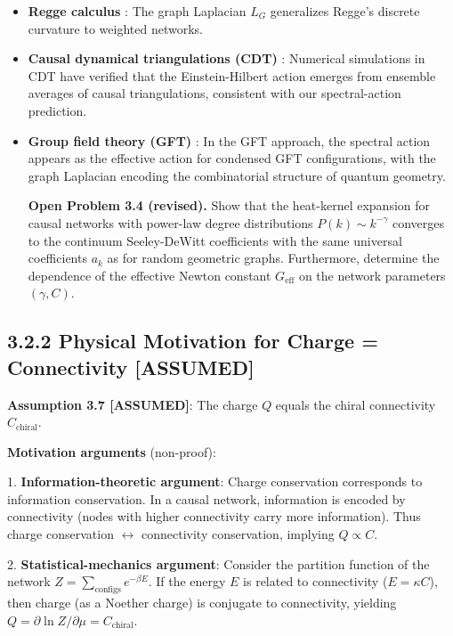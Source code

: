 \documentclass[11pt,a4paper]{article}
\theoremstyle{plain}
\theoremstyle{definition}
\begin{document}
\begin{itemize}
\item \textbf{Regge calculus} \cite{Regge1961}: The graph Laplacian $L_G$ generalizes Regge's discrete curvature to weighted networks.
\item \textbf{Causal dynamical triangulations (CDT)} \cite{Oriti2014}: Numerical simulations in CDT have verified that the Einstein-Hilbert action emerges from ensemble averages of causal triangulations, consistent with our spectral-action prediction.
\item \textbf{Group field theory (GFT)} \cite{Chamseddine1997}: In the GFT approach, the spectral action appears as the effective action for condensed GFT configurations, with the graph Laplacian encoding the combinatorial structure of quantum geometry.

\textbf{Open Problem 3.4 (revised).} Show that the heat-kernel expansion for causal networks with power-law degree distributions $P(k) \sim k^{-\gamma}$ converges to the continuum Seeley-DeWitt coefficients with the same universal coefficients $a_k$ as for random geometric graphs. Furthermore, determine the dependence of the effective Newton constant $G_{\text{eff}}$ on the network parameters $(\gamma, C)$.

\end{itemize}
\subsection{3.2.2 Physical Motivation for Charge = Connectivity \textbf{[ASSUMED]}}

\textbf{Assumption 3.7 \textbf{[ASSUMED]}}: The charge $Q$ equals the chiral connectivity $C_{\text{chiral}}$.

\textbf{Motivation arguments} (non-proof):

1. \textbf{Information-theoretic argument}: Charge conservation corresponds to information conservation. In a causal network, information is encoded by connectivity (nodes with higher connectivity carry more information). Thus charge conservation $\leftrightarrow$ connectivity conservation, implying $Q \propto C$.

2. \textbf{Statistical-mechanics argument}: Consider the partition function of the network $Z = \sum_{\text{configs}} e^{-\beta E}$. If the energy $E$ is related to connectivity ($E = \kappa C$), then charge (as a Noether charge) is conjugate to connectivity, yielding $Q = \partial \ln Z / \partial \mu = C_{\text{chiral}}$.
\end{document}
